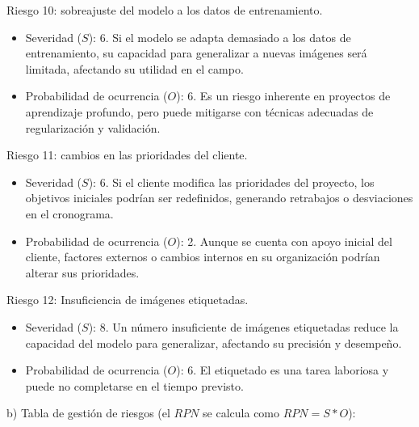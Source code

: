 \documentclass[
11pt, %
]{charter}
\begin{document}
Riesgo 10: sobreajuste del modelo a los datos de entrenamiento.
\begin{itemize}
  \item Severidad ($S$): 6. Si el modelo se adapta demasiado a los datos de entrenamiento, su capacidad para generalizar a nuevas imágenes será limitada, afectando su utilidad en el campo.
  \item Probabilidad de ocurrencia ($O$): 6. Es un riesgo inherente en proyectos de aprendizaje profundo, pero puede mitigarse con técnicas adecuadas de regularización y validación.
\end{itemize}

Riesgo 11: cambios en las prioridades del cliente.
\begin{itemize}
  \item Severidad ($S$): 6. Si el cliente modifica las prioridades del proyecto, los objetivos iniciales podrían ser redefinidos, generando retrabajos o desviaciones en el cronograma.
  \item Probabilidad de ocurrencia ($O$): 2. Aunque se cuenta con apoyo inicial del cliente, factores externos o cambios internos en su organización podrían alterar sus prioridades.
\end{itemize}

Riesgo 12: Insuficiencia de imágenes etiquetadas.
\begin{itemize}
  \item Severidad ($S$): 8. Un número insuficiente de imágenes etiquetadas reduce la capacidad del modelo para generalizar, afectando su precisión y desempeño.
  \item Probabilidad de ocurrencia ($O$): 6. El etiquetado es una tarea laboriosa y puede no completarse en el tiempo previsto.
\end{itemize}

b) Tabla de gestión de riesgos (el $RPN$ se calcula como $RPN=S*O$):
\end{document}
